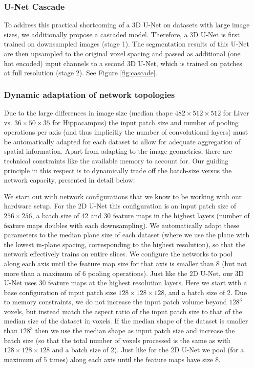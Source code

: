 \documentclass{templates/llncs} %
\begin{document}
    \subsubsection{U-Net Cascade}
    To address this practical shortcoming of a 3D U-Net on datasets with large image sizes, we additionally propose a cascaded model. Therefore, a 3D U-Net is first trained on downsampled images (stage 1). The segmentation results of this U-Net are then upsampled to the original voxel spacing and passed as additional (one hot encoded) input channels to a second 3D U-Net, which is trained on patches at full resolution (stage 2). See Figure \ref{fig:cascade}.
    
    \subsubsection{Dynamic adaptation of network topologies}
    Due to the large differences in image size (median shape $482 \times 512 \times 512$ for Liver vs. $36 \times 50 \times 35$ for Hippocampus) the input patch size and number of pooling operations per axis (and thus implicitly the number of convolutional layers) must be automatically adapted for each dataset to allow for adequate aggregation of spatial information. Apart from adapting to the image geometries, there are technical constraints like the available memory to account for. Our guiding principle in this respect is to dynamically trade off the batch-size versus the network capacity, presented in detail below:
    
    We start out with network configurations that we know to be working with our hardware setup. For the 2D U-Net this configuration is an input patch size of $256 \times 256$, a batch size of 42 and 30 feature maps in the highest layers (number of feature maps doubles with each downsampling). We automatically adapt these parameters to the median plane size of each dataset (where we use the plane with the lowest in-plane spacing, corresponding to the highest resolution), so that the network effectively trains on entire slices. We configure the networks to pool along each axis until the feature map size for that axis is smaller than 8 (but not more than a maximum of 6 pooling operations). 
    Just like the 2D U-Net, our 3D U-Net uses 30 feature maps at the highest resolution layers. Here we start with a base configuration of input patch size $128 \times 128 \times 128$, and a batch size of 2. Due to memory constraints, we do not increase the input patch volume beyond $128^3$ voxels, but instead match the aspect ratio of the input patch size to that of the median size of the dataset in voxels. If the median shape of the dataset is smaller than $128^3$ then we use the median shape as input patch size and increase the batch size (so that the total number of voxels processed is the same as with $128 \times 128 \times 128$ and a batch size of 2). Just like for the 2D U-Net we pool (for a maximum of 5 times) along each axis until the feature maps have size 8.
    
\end{document}
